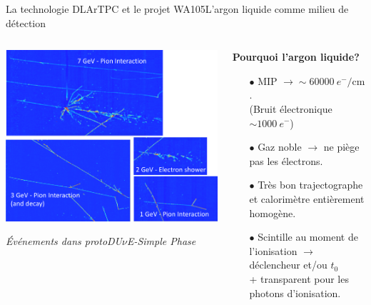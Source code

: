   \begin{frame}{La technologie DLArTPC et le projet WA105}{L'argon liquide comme milieu de détection}
	  \begin{scriptsize}
    	\begin{columns}
    		\begin{column}{0.6\textwidth}
    			\centering
    			\includegraphics[width=\textwidth]{./pictures/SP_evt.png}\\
    			\flushleft
    			\begin{footnotesize}\textit{Événements dans protoDU$\nu$E-Simple Phase}\end{footnotesize}
    		\end{column}
    		\begin{column}{0.4\textwidth}
    			\begin{footnotesize}
    				\textbf{Pourquoi l'argon liquide?}
    			\end{footnotesize}
    			\begin{itemize}
    				\item[$\bullet$] MIP $\rightarrow\sim\SI{60000}{e^-\per\centi\meter}$. \\
    				(Bruit électronique $\sim \SI{1000}{e^-}$)
    				\item[$\bullet$] Gaz noble $\rightarrow$ ne piège pas les électrons.
    				\item[$\bullet$] Très bon trajectographe et calorimètre entièrement homogène.
    				\item[$\bullet$] Scintille au moment de l'ionisation $\rightarrow$ déclencheur et/ou $t_0$ \\ + transparent pour les photons  d'ionisation.

\end{itemize}
\end{column}
\end{columns}
\end{scriptsize}
\end{frame}
